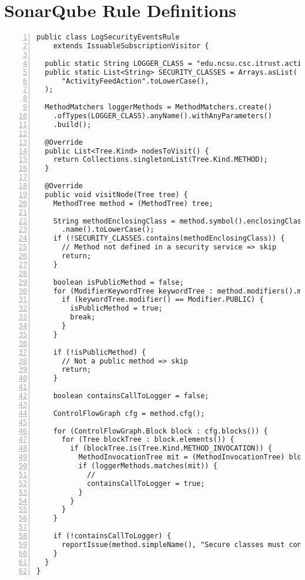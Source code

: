 \chapter{SonarQube Rule Definitions}
\label{apx:sonarqube}

\begin{lstlisting}[caption={Constraint 1.}, captionpos=b, label=lst:sq_1, numbers=left, showstringspaces=false]
public class LogSecurityEventsRule
    extends IssuableSubscriptionVisitor {

  public static String LOGGER_CLASS = "edu.ncsu.csc.itrust.action.EventLoggingAction";
  public static List<String> SECURITY_CLASSES = Arrays.asList(
      "ActivityFeedAction".toLowerCase(),
  );

  MethodMatchers loggerMethods = MethodMatchers.create()
    .ofTypes(LOGGER_CLASS).anyName().withAnyParameters()
    .build();

  @Override
  public List<Tree.Kind> nodesToVisit() {
    return Collections.singletonList(Tree.Kind.METHOD);
  }

  @Override
  public void visitNode(Tree tree) {
    MethodTree method = (MethodTree) tree;

    String methodEnclosingClass = method.symbol().enclosingClass()
      .name().toLowerCase();
    if (!SECURITY_CLASSES.contains(methodEnclosingClass)) {
      // Method not defined in a security service => skip
      return;
    }

    boolean isPublicMethod = false;
    for (ModifierKeywordTree keywordTree : method.modifiers().modifiers()) {
      if (keywordTree.modifier() == Modifier.PUBLIC) {
        isPublicMethod = true;
        break;
      }
    }

    if (!isPublicMethod) {
      // Not a public method => skip
      return;
    }

    boolean containsCallToLogger = false;

    ControlFlowGraph cfg = method.cfg();

    for (ControlFlowGraph.Block block : cfg.blocks()) {
      for (Tree blockTree : block.elements()) {
        if (blockTree.is(Tree.Kind.METHOD_INVOCATION)) {
          MethodInvocationTree mit = (MethodInvocationTree) blockTree;
          if (loggerMethods.matches(mit)) {
            // 
            containsCallToLogger = true;
          }
        }
      }
    }

    if (!containsCallToLogger) {
      reportIssue(method.simpleName(), "Secure classes must contain call to logger");
    }
  }
}
\end{lstlisting}

